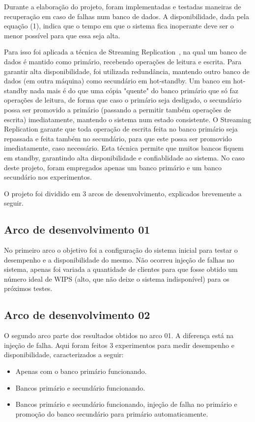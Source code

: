 \documentclass[11pt,twoside]{article}
\begin{document}
Durante a elaboração do projeto, foram implementadas e testadas maneiras de recuperação em caso de falhas num banco de dados. A disponibilidade, dada pela equação (1), indica que o tempo em que o sistema fica inoperante deve ser o menor possível para que essa seja alta.

Para isso foi aplicada a técnica de Streaming Replication~\cite{SR}, na qual um banco de dados é mantido como primário, recebendo operações de leitura e escrita. Para garantir alta disponibilidade, foi utilizada redundância, mantendo outro banco de dados (em outra máquina) como secundário em hot-standby. Um banco em hot-standby nada mais é do que uma cópia "quente" do banco primário que só faz operações de leitura, de forma que caso o primário seja desligado, o secundário possa ser promovido a primário (passando a permitir também operações de escrita) imediatamente, mantendo o sistema num estado consistente. O Streaming Replication garante que toda operação de escrita feita no banco primário seja repassada e feita também no secundário, para que este possa ser promovido imediatamente, caso necessário. Esta técnica permite que muitos bancos fiquem em standby, garantindo alta disponibilidade e confiablidade ao sistema. No caso deste projeto, foram empregados apenas um banco primário e um banco secundário nos experimentos.

O projeto foi dividido em 3 arcos de desenvolvimento, explicados brevemente a seguir.

\subsection{Arco de desenvolvimento 01}

    No primeiro arco o objetivo foi a configuração do sistema inicial para testar o desempenho e a disponibilidade do mesmo. Não ocorreu injeção de falhas no sistema, apenas foi variada a quantidade de clientes para que fosse obtido um número ideal de WIPS (alto, que não deixe o sistema indisponível) para os próximos testes.

\subsection{Arco de desenvolvimento 02}

    O segundo arco parte dos resultados obtidos no arco 01. A diferença está na injeção de falha. Aqui foram feitos 3 experimentos para medir desempenho e disponibilidade, caracterizados a seguir: 
    \begin{itemize}
        \item Apenas com o banco primário funcionando.
        \item Bancos primário e secundário funcionando.
        \item Bancos primário e secundário funcionando, injeção de falha no primário e promoção do banco secundário para primário automaticamente.
    \end{itemize}
\end{document}
